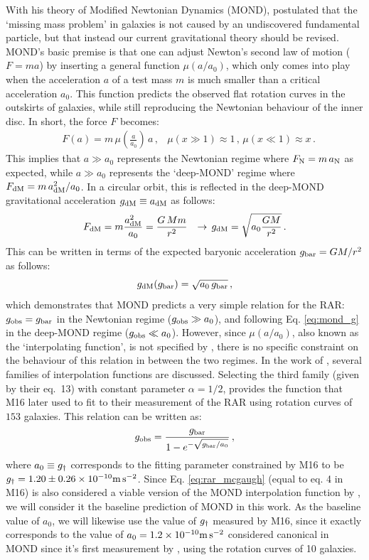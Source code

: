 \documentclass[usenatbib]{mnras}
\newcommand{\mpss}{ {\rm m}\,{\rm s}^{-2} }
\newcommand*{\E}[1]{\times 10^{#1}}
\newcommand{\un}[1]{_{\rm #1}}
\begin{document}
With his theory of Modified Newtonian Dynamics (MOND), \cite{milgrom1983} postulated that the `missing mass problem' in galaxies is not caused by an undiscovered fundamental particle, but that instead our current gravitational theory should be revised. MOND's basic premise is that one can adjust Newton's second law of motion ($F=ma$) by inserting a general function $\mu(a/a_0)$, which only comes into play when the acceleration $a$ of a test mass $m$ is much smaller than a critical acceleration $a_0$. This function predicts the observed flat rotation curves in the outskirts of galaxies, while still reproducing the Newtonian behaviour of the inner disc. In short, the force $F$ becomes:
\begin{align}\label{eq:mond_f}
	& F(a) = m \, \mu(\frac{a}{a_0}) \, a \, ,
	& \mu(x \gg 1) \approx 1 \, , \, \mu(x \ll 1) \approx x \, .
\end{align}
This implies that $a\gg a_0$ represents the Newtonian regime where $F\un{N} = m \, a\un{N}$ as expected, while $a\gg a_0$ represents the `deep-MOND' regime where $F\un{dM}=m \, a\un{dM}^2/a_0$. In a circular orbit, this is reflected in the deep-MOND gravitational acceleration $g\un{dM} \equiv a\un{dM}$ as follows:
\begin{align}\label{eq:mond_g}
	& F\un{dM} = m \frac{a\un{dM}^2}{a_0} = \frac{G \, M m}{r^2}
	& \rightarrow \,  g\un{dM} = \sqrt{a_0 \frac{G M}{r^2}} \, .
\end{align}
This can be written in terms of the expected baryonic acceleration $g\un{bar}=GM/r^2$ as follows:
\begin{equation}
	g\un{dM}(g\un{bar}) = \sqrt{a_0 \, g\un{bar}} \, ,
\end{equation}
which demonstrates that MOND predicts a very simple relation for the RAR: $g\un{obs}=g\un{bar}$ in the Newtonian regime ($g\un{obs}\gg a_0$), and following Eq. \ref{eq:mond_g} in the deep-MOND regime ($g\un{obs}\ll a_0$). However, since $\mu(a/a_0)$, also known as the `interpolating function', is not specified by \cite{milgrom1983}, there is no specific constraint on the behaviour of this relation in between the two regimes. In the work of \cite{milgrom2008}, several families of interpolation functions are discussed. Selecting the third family (given by their eq.~13) with constant parameter $\alpha=1/2$, provides the function that M16 later used to fit to their measurement of the RAR using rotation curves of $153$ galaxies. This relation can be written as:
\begin{equation}\label{eq:rar_mcgaugh}
	g\un{obs} = \frac{g\un{bar}}{1 - e^{-\sqrt{g\un{bar}/a_0}}} \, ,
\end{equation}
where $a_0 \equiv g\un{\dagger}$ corresponds to the fitting parameter constrained by M16 to be $g\un{\dagger}=1.20\pm0.26\E{-10} \mpss$. Since Eq. \ref{eq:rar_mcgaugh} (equal to eq. 4 in M16) is also considered a viable version of the MOND interpolation function by \cite{milgrom2008}, we will consider it the baseline prediction of MOND in this work. As the baseline value of $a_0$, we will likewise use the value of $g\un{\dagger}$ measured by M16, since it exactly corresponds to the value of $a_0=1.2\E{-10} \mpss$ considered canonical in MOND since it's first measurement by \cite{begeman1991}, using the rotation curves of 10 galaxies.
\end{document}
